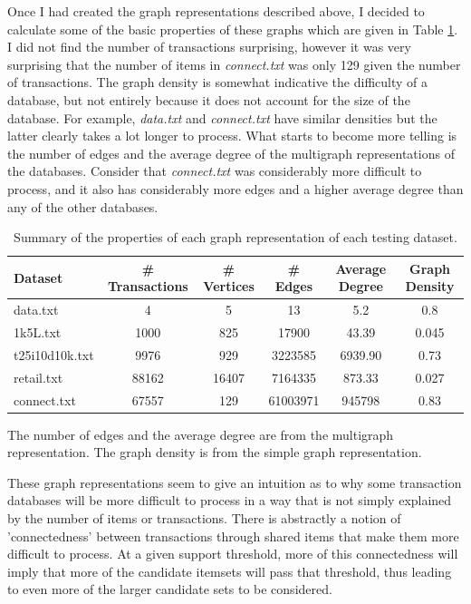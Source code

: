 \documentclass[12 pt]{article}
\begin{document}
Once I had created the graph representations described above, I decided to calculate some of the basic properties of these graphs which are given in Table \ref{tab:graphs}. I did not find the number of transactions surprising, however it was very surprising that the number of items in \textit{connect.txt} was only 129 given the number of transactions. The graph density is somewhat indicative the difficulty of a database, but not entirely because it does not account for the size of the database. For example, \textit{data.txt} and \textit{connect.txt} have similar densities but the latter clearly takes a lot longer to process. What starts to become more telling is the number of edges and the average degree of the multigraph representations of the databases. Consider that \textit{connect.txt} was considerably more difficult to process, and it also has considerably more edges and a higher average degree than any of the other databases.

\begin{table}[H]
\caption{Summary of the properties of each graph representation of each testing dataset.}
\centering
\begin{tabular}{lccccc}
	\hline
	Dataset & \# Transactions & \# Vertices & \# Edges & Average Degree & Graph Density \\
	\hline
	data.txt & 4 & 5 & 13 & 5.2 & 0.8 \\
	1k5L.txt & 1000 & 825 & 17900 & 43.39 & 0.045 \\
	t25i10d10k.txt & 9976 & 929 & 3223585 & 6939.90 & 0.73 \\
	retail.txt & 88162 & 16407 & 7164335 & 873.33 & 0.027 \\
	connect.txt & 67557 & 129 & 61003971 & 945798 & 0.83 \\
	\hline
\end{tabular}

{\tiny The number of edges and the average degree are from the multigraph representation. The graph density is from the simple graph representation.}
\label{tab:graphs}
\end{table}

These graph representations seem to give an intuition as to why some transaction databases will be more difficult to process in a way that is not simply explained by the number of items or transactions. There is abstractly a notion of 'connectedness' between transactions through shared items that make them more difficult to process. At a given support threshold, more of this connectedness will imply that more of the candidate itemsets will pass that threshold, thus leading to even more of the larger candidate sets to be considered.
\end{document}
